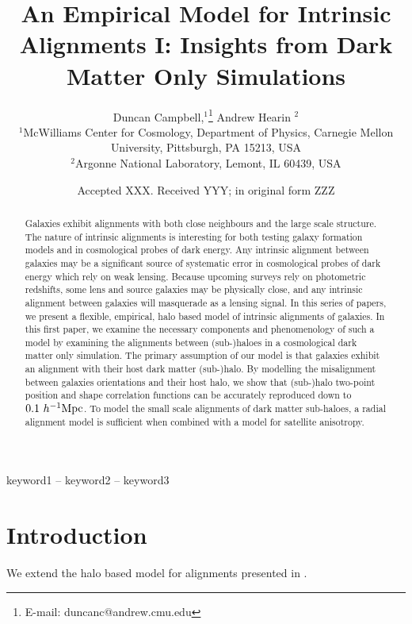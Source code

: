 \documentclass[fleqn,usenatbib]{mnras}
\title[An Empirical Model for Intrinsic Alignments I]{An Empirical Model for Intrinsic Alignments I: Insights from Dark Matter Only Simulations}
\author[D. Campbell]{
Duncan Campbell,$^{1}$\thanks{E-mail: duncanc@andrew.cmu.edu}
Andrew Hearin $^{2}$
\\
$^{1}$McWilliams Center for Cosmology, Department of Physics, Carnegie Mellon University, Pittsburgh, PA 15213, USA \\
$^{2}$Argonne National Laboratory, Lemont, IL 60439, USA
\\
}
\date{Accepted XXX. Received YYY; in original form ZZZ}
\begin{document}
\label{firstpage}
\pagerange{\pageref{firstpage}--\pageref{lastpage}}
\maketitle

\begin{abstract}
Galaxies exhibit alignments with both close neighbours and the large scale structure.  The nature of intrinsic alignments is interesting for both testing galaxy formation models and in cosmological probes of dark energy.  Any intrinsic alignment between galaxies may be a significant source of systematic error in cosmological probes of dark energy which rely on weak lensing.  Because upcoming surveys rely on photometric redshifts, some lens and source galaxies may be physically close, and any intrinsic alignment between galaxies will masquerade as a lensing signal.  In this series of papers, we present a flexible, empirical, halo based model of intrinsic alignments of galaxies.  In this first paper, we examine the necessary components and phenomenology of such a model by examining the alignments between (sub-)haloes in a cosmological dark matter only simulation.  The primary assumption of our model is that galaxies exhibit an alignment with their host dark matter (sub-)halo.  By modelling the misalignment between galaxies orientations and their host halo, we show that (sub-)halo two-point position and shape correlation functions can be accurately reproduced down to $0.1~h^{-1}{\rm Mpc}$.  To model the small scale alignments of dark matter sub-haloes, a radial alignment model is sufficient when combined with a model for satellite anisotropy.   \end{abstract}

\begin{keywords}
keyword1 -- keyword2 -- keyword3
\end{keywords}



\section{Introduction}

We extend the halo based model for alignments presented in \citet{Schneider:2010cg}.
\end{document}
